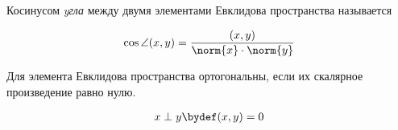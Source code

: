 
\begin{definition}
  Косинусом \textit{yгла} между двумя элементами Евклидова пространства
  называется

  \begin{align*}
    \cos \angle (x, y) = \frac{(x, y)}{\norm{x} \cdot \norm{y}}
  \end{align*}
\end{definition}

\begin{definition}\label{item-ort}
  Для элемента Евклидова пространства ортогональны, если их скалярное
  произведение равно нулю.

  \begin{align*}
    x \perp y \bydef (x, y) = 0
  \end{align*}
\end{definition}


